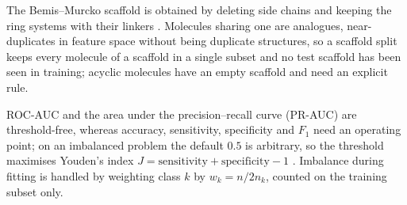 The Bemis--Murcko scaffold is obtained by deleting side chains and keeping the ring systems with their linkers \parencite{Bemis}. Molecules sharing one are analogues, near-duplicates in feature space without being duplicate structures, so a scaffold split keeps every molecule of a scaffold in a single subset and no test scaffold has been seen in training; acyclic molecules have an empty scaffold and need an explicit rule.

ROC-AUC and the area under the precision--recall curve (PR-AUC) are threshold-free, whereas accuracy, sensitivity, specificity and $F_1$ need an operating point; on an imbalanced problem the default $0.5$ is arbitrary, so the threshold maximises Youden's index $J = \text{sensitivity} + \text{specificity} - 1$ \parencite{Youden}. Imbalance during fitting is handled by weighting class $k$ by $w_k = n / 2n_k$, counted on the training subset only.
